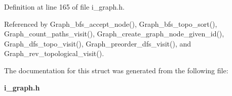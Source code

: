 Definition at line 165 of file i\_\-graph.h.

Referenced by Graph\_\-bfs\_\-accept\_\-node(), Graph\_\-bfs\_\-topo\_\-sort(), Graph\_\-count\_\-paths\_\-visit(), Graph\_\-create\_\-graph\_\-node\_\-given\_\-id(), Graph\_\-dfs\_\-topo\_\-visit(), Graph\_\-preorder\_\-dfs\_\-visit(), and Graph\_\-rev\_\-topological\_\-visit().

The documentation for this struct was generated from the following file:\begin{CompactItemize}
\item 
\bf{i\_\-graph.h}\end{CompactItemize}
